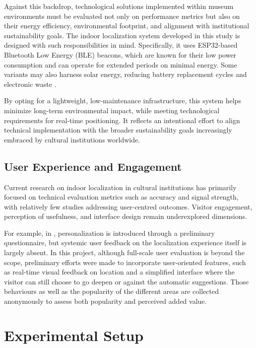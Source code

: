 Against this backdrop, technological solutions implemented within museum environments must be evaluated not only on performance metrics but also on their energy efficiency, environmental footprint, and alignment with institutional sustainability goals. The indoor localization system developed in this study is designed with such responsibilities in mind. Specifically, it uses ESP32-based Bluetooth Low Energy (BLE) beacons, which are known for their low power consumption and can operate for extended periods on minimal energy. Some variants may also harness solar energy, reducing battery replacement cycles and electronic waste \cite{spachos_ble_2020}.

By opting for a lightweight, low-maintenance infrastructure, this system helps minimize long-term environmental impact, while meeting technological requirements for real-time positioning. It reflects an intentional effort to align technical implementation with the broader sustainability goals increasingly embraced by cultural institutions worldwide.

\subsection{User Experience and Engagement}

Current research on indoor localization in cultural institutions has primarily focused on technical evaluation metrics such as accuracy and signal strength, with relatively few studies addressing user-centred outcomes. Visitor engagement, perception of usefulness, and interface design remain underexplored dimensions.  

For example, in \cite{alletto_indoor_2016}, personalization is introduced through a preliminary questionnaire, but systemic user feedback on the localization experience itself is largely absent. In this project, although full-scale user evaluation is beyond the scope, preliminary efforts were made to incorporate user-oriented features, such as real-time visual feedback on location and a simplified interface where the visitor can still choose to go deepen or against the automatic suggestions. Those behaviours as well as the popularity of the different areas are collected anonymously to assess both popularity and perceived added value. 

\section{Experimental Setup}

